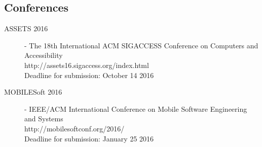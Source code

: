 \subsection{Conferences} 
\begin{description}
    \item[ASSETS 2016] - The 18th International ACM SIGACCESS Conference on Computers and Accessibility \\
http://assets16.sigaccess.org/index.html \\
Deadline for submission: October 14 2016
    \item[MOBILESoft 2016] - IEEE/ACM International Conference on Mobile Software Engineering and Systems \\
http://mobilesoftconf.org/2016/ \\
Deadline for submission: January 25 2016
 
\end{description}
